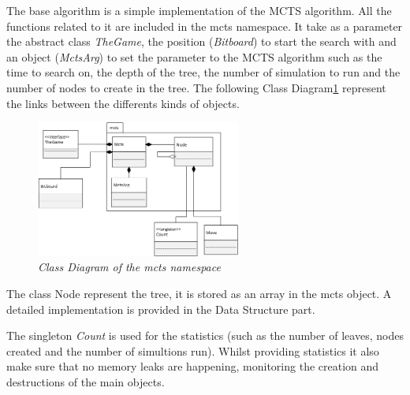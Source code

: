 The base algorithm is a simple implementation of the MCTS algorithm. All the functions related to it are included in the mcts namespace.
It take as a parameter the abstract class \textit{TheGame}, the position (\textit{Bitboard}) to start the search with and an object (\textit{MctsArg}) to set the parameter to the MCTS algorithm such as the time to search on, the depth of the tree, the number of simulation to run and the number of nodes to create in the tree.
The following Class Diagram\ref{fig:MCTSClassDiagram} represent the links between the differents kinds of objects.
\begin{figure}[H] 
\centerline{\includegraphics[width=0.6\textwidth]{Base_Algorithm/Img/MCTSsimple.png}}
\caption{\label{fig:MCTSClassDiagram}\textit{Class Diagram of the mcts namespace}}
\end{figure}
The class Node represent the tree, it is stored as an array in the mcts object. A detailed implementation is provided in the Data Structure part.

The singleton \textit{Count} is used for the statistics (such as the number of leaves, nodes created and the number of simultions run). Whilst providing statistics it also make sure that no  memory leaks are happening, monitoring the creation and destructions of the main objects.

